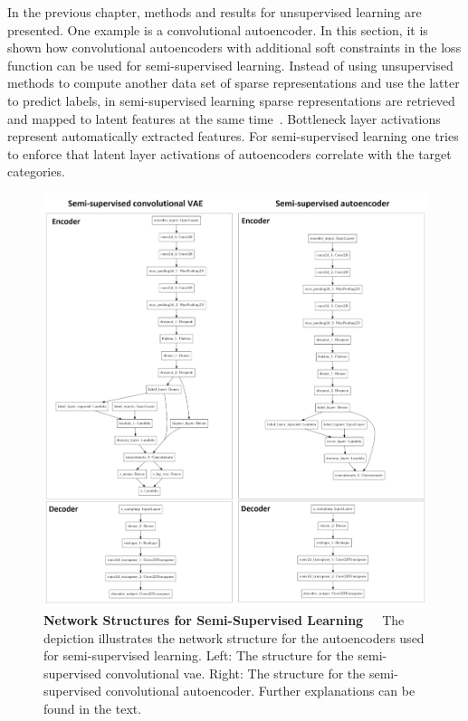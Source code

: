 \bigskip
In the previous chapter, methods and results for unsupervised learning are presented. One example is a convolutional autoencoder. In this section, it is shown how convolutional autoencoders with additional soft constraints in the loss function can be used for semi-supervised learning. Instead of using unsupervised methods to compute another data set of sparse representations and use the latter to predict labels, in semi-supervised learning sparse representations are retrieved and mapped to latent features at the same time~\citep{keng2017semi}. Bottleneck layer activations represent automatically extracted features. For semi-supervised learning one tries to enforce that latent layer activations of autoencoders correlate with the target categories.

\begin{figure}[!htb]
	\centering
	\includegraphics[scale=0.8]{Figures/chapter04/semi_supervised_network.png}
	\decoRule
	\caption[Network Structures for Semi-Supervised Learning]{\textbf{Network Structures for Semi-Supervised Learning}~~~The depiction illustrates the network structure for the autoencoders used for semi-supervised learning. Left: The structure for the semi-supervised convolutional \acrlong{vae}. Right: The structure for the semi-supervised convolutional autoencoder. Further explanations can be found in the text.}
	\label{fig:SemiSupervisedNetworkStructures}
\end{figure}

